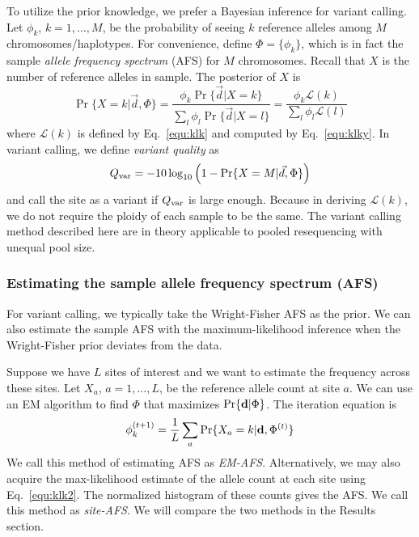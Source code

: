 \documentclass{bioinfo}
\begin{document}
\begin{methods}
To utilize the prior knowledge, we prefer a Bayesian inference for variant calling.
Let $\phi_k$, $k=1,\ldots,M$, be the probability of seeing $k$ reference alleles
among $M$ chromosomes/haplotypes. For convenience, define $\Phi=\{\phi_k\}$, which
is in fact the sample \emph{allele frequency spectrum} (AFS) for $M$ chromosomes. Recall
that $X$ is the number of reference alleles in sample. The posterior of $X$ is
\begin{equation}\label{eq:post}
\Pr\{X=k|\vec{d},\Phi\}=\frac{\phi_k\Pr\{\vec{d}|X=k\}}{\sum_l\phi_l\Pr\{\vec{d}|X=l\}}
=\frac{\phi_k\mathcal{L}(k)}{\sum_l\phi_l\mathcal{L}(l)}
\end{equation}
where $\mathcal{L}(k)$ is defined by Eq.~\eqref{equ:klk} and computed by Eq.~\eqref{equ:klky}.
In variant calling, we define \emph{variant quality} as
$$
Q_{\rm var}=-10\log_{10}\Big(1-\Pr\{X=M|\vec{d},\Phi\}\Big)
$$
and call the site as a variant if $Q_{\rm var}$ is large enough. Because in deriving
$\mathcal{L}(k)$, we do not require the ploidy of each sample to be the same. The
variant calling method described here are in theory applicable to pooled resequencing with unequal pool size.

\subsubsection{Estimating the sample allele frequency spectrum (AFS)}
For variant calling, we typically take the Wright-Fisher AFS as the prior. We can also
estimate the sample AFS with the maximum-likelihood inference when the Wright-Fisher prior
deviates from the data.

Suppose we have $L$ sites of interest and we want to estimate the frequency across these sites.
Let $X_a$, $a=1,\ldots,L$, be the reference allele count at site $a$. We can use an EM algorithm
to find $\Phi$ that maximizes $\Pr\{{\bf d}|\Phi\}$. The iteration equation is
\begin{equation}\label{eq:afs}
\phi_k^{(t+1)}=\frac{1}{L}\sum_a\Pr\{X_a=k|{\bf d},\Phi^{(t)}\}
\end{equation}
We call this method of estimating AFS as \emph{EM-AFS}. Alternatively, we may also acquire the max-likelihood
estimate of the allele count at each site using Eq.~\eqref{equ:klk2}. The normalized histogram of these counts
gives the AFS. We call this method as \emph{site-AFS}. We will compare the two methods in the Results section.


\end{methods}
\end{document}
